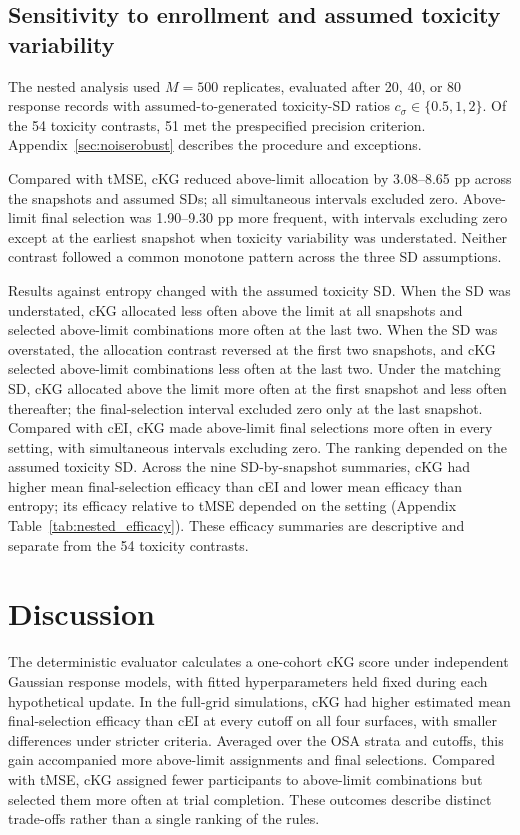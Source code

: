 \documentclass[11pt]{article}
\newcommand{\rev}[1]{{#1}}
\begin{document}
\subsection{Sensitivity to enrollment and assumed toxicity variability}

\rev{The nested analysis used $M=500$ replicates, evaluated after 20, 40, or 80 response records with assumed-to-generated toxicity-SD ratios $c_\sigma\in\{0.5,1,2\}$. Of the 54 toxicity contrasts, 51 met the prespecified precision criterion.} Appendix~\ref{sec:noiserobust} describes the procedure and exceptions.

Compared with tMSE, cKG reduced above-limit allocation by 3.08--8.65 \rev{pp} across the snapshots and assumed SDs; all simultaneous intervals excluded zero. Above-limit final selection was 1.90--9.30 \rev{pp} more frequent, with intervals excluding zero except at the earliest snapshot when toxicity variability was understated. Neither contrast followed a common monotone pattern across the three SD assumptions.

Results against entropy changed with the assumed toxicity SD. When the SD was understated, cKG allocated less often above the limit at all snapshots and selected above-limit combinations more often at the last two. When the SD was overstated, the allocation contrast reversed at the first two snapshots, and cKG selected above-limit combinations less often at the last two. Under the matching SD, cKG allocated above the limit more often at the first snapshot and less often thereafter; the final-selection interval excluded zero only at the last snapshot. Compared with cEI, cKG made above-limit final selections more often in every setting, with simultaneous intervals excluding zero. \rev{The ranking depended on the assumed toxicity SD. Across the nine SD-by-snapshot summaries, cKG had higher mean final-selection efficacy than cEI and lower mean efficacy than entropy; its efficacy relative to tMSE depended on the setting (Appendix Table~\ref{tab:nested_efficacy}). These efficacy summaries are descriptive and separate from the 54 toxicity contrasts.}

\section{Discussion}\label{sec:discussion}

\rev{The deterministic evaluator calculates a one-cohort cKG score under independent Gaussian response models, with fitted hyperparameters held fixed during each hypothetical update. In the full-grid simulations, cKG had higher estimated mean final-selection efficacy than cEI at every cutoff on all four surfaces, with smaller differences under stricter criteria. Averaged over the OSA strata and cutoffs, this gain accompanied more above-limit assignments and final selections. Compared with tMSE, cKG assigned fewer participants to above-limit combinations but selected them more often at trial completion. These outcomes describe distinct trade-offs rather than a single ranking of the rules.}
\end{document}
